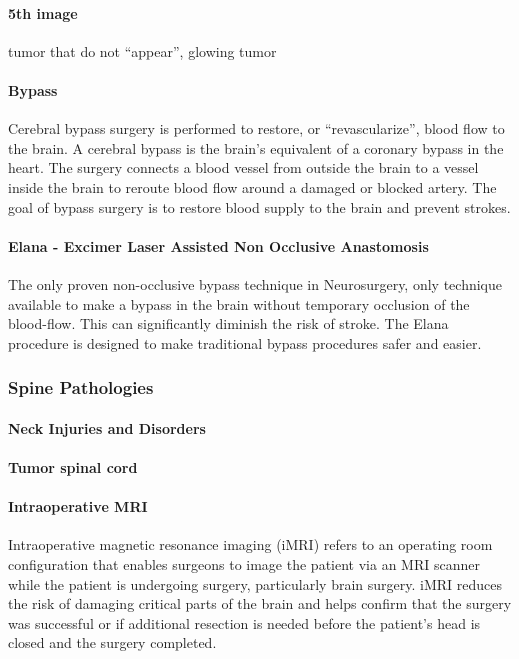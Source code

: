 \documentclass[12pt,article,oneside,a4paper]{memoir}
\begin{document}
\paragraph{5th image} tumor that do not ``appear'', glowing tumor
 
\paragraph{Bypass}
Cerebral bypass surgery is performed to restore, or ``revascularize'', blood 
flow to the brain. A cerebral bypass is the brain's equivalent of a coronary
bypass in the heart. The surgery connects a blood vessel from outside the brain
to a vessel inside the brain to reroute blood flow around a damaged or blocked
artery. The goal of bypass surgery is to restore blood supply to the brain and
prevent strokes.

\paragraph{Elana - Excimer Laser Assisted Non Occlusive Anastomosis}
The only proven non-occlusive bypass technique in Neurosurgery, only technique
available to make a bypass in the brain without temporary occlusion of the
blood-flow. This can significantly diminish the risk of stroke. The Elana
procedure is designed to make traditional bypass procedures safer and easier.

\subsubsection{Spine Pathologies}
\paragraph{Neck Injuries and Disorders}
\paragraph{Tumor spinal cord} 

\paragraph{Intraoperative MRI}
Intraoperative magnetic resonance imaging (iMRI) refers to an operating room
configuration that enables surgeons to image the patient via an MRI scanner while
the patient is undergoing surgery, particularly brain surgery. iMRI reduces the
risk of damaging critical parts of the brain and helps confirm that the surgery
was successful or if additional resection is needed before the patient’s head
is closed and the surgery completed.
\end{document}

